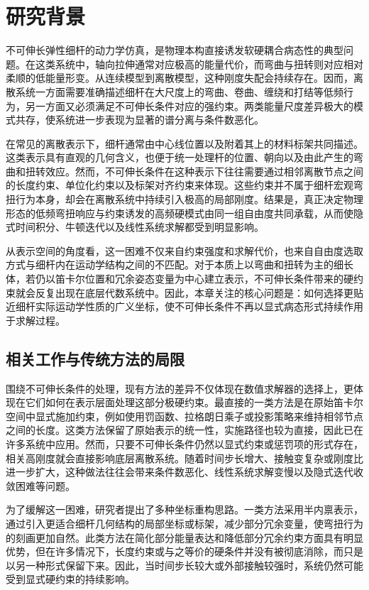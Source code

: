 \section{研究背景}

不可伸长弹性细杆的动力学仿真，是物理本构直接诱发软硬耦合病态性的典型问题。在这类系统中，轴向拉伸通常对应极高的能量代价，而弯曲与扭转则对应相对柔顺的低能量形变。从连续模型到离散模型，这种刚度失配会持续存在。因而，离散系统一方面需要准确描述细杆在大尺度上的弯曲、卷曲、缠绕和打结等低频行为，另一方面又必须满足不可伸长条件对应的强约束。两类能量尺度差异极大的模式共存，使系统进一步表现为显著的谱分离与条件数恶化。

在常见的离散表示下，细杆通常由中心线位置以及附着其上的材料标架共同描述。这类表示具有直观的几何含义，也便于统一处理杆的位置、朝向以及由此产生的弯曲和扭转效应。然而，不可伸长条件在这种表示下往往需要通过相邻离散节点之间的长度约束、单位化约束以及标架对齐约束来体现。这些约束并不属于细杆宏观弯扭行为本身，却会在离散系统中持续引入极高的局部刚度。结果是，真正决定物理形态的低频弯扭响应与约束诱发的高频硬模式由同一组自由度共同承载，从而使隐式时间积分、牛顿迭代以及线性系统求解都受到明显影响。

从表示空间的角度看，这一困难不仅来自约束强度和求解代价，也来自自由度选取方式与细杆内在运动学结构之间的不匹配。对于本质上以弯曲和扭转为主的细长体，若仍以笛卡尔位置和冗余姿态变量为中心建立表示，不可伸长条件带来的硬约束就会反复出现在底层代数系统中。因此，本章关注的核心问题是：如何选择更贴近细杆实际运动学性质的广义坐标，使不可伸长条件不再以显式病态形式持续作用于求解过程。

\subsection{相关工作与传统方法的局限}

围绕不可伸长条件的处理，现有方法的差异不仅体现在数值求解器的选择上，更体现在它们如何在表示层面处理这部分极硬约束。最直接的一类方法是在原始笛卡尔空间中显式施加约束，例如使用罚函数、拉格朗日乘子或投影策略来维持相邻节点之间的长度。这类方法保留了原始表示的统一性，实施路径也较为直接，因此已在许多系统中应用。然而，只要不可伸长条件仍然以显式约束或惩罚项的形式存在，相关高刚度就会直接影响底层离散系统。随着时间步长增大、接触变复杂或刚度比进一步扩大，这种做法往往会带来条件数恶化、线性系统求解变慢以及隐式迭代收敛困难等问题。

为了缓解这一困难，研究者提出了多种坐标重构思路。一类方法采用半内禀表示，通过引入更适合细杆几何结构的局部坐标或标架，减少部分冗余变量，使弯扭行为的刻画更加自然。此类方法在简化部分能量表达和降低部分冗余约束方面具有明显优势，但在许多情况下，长度约束或与之等价的硬条件并没有被彻底消除，而只是以另一种形式保留下来。因此，当时间步长较大或外部接触较强时，系统仍然可能受到显式硬约束的持续影响。

